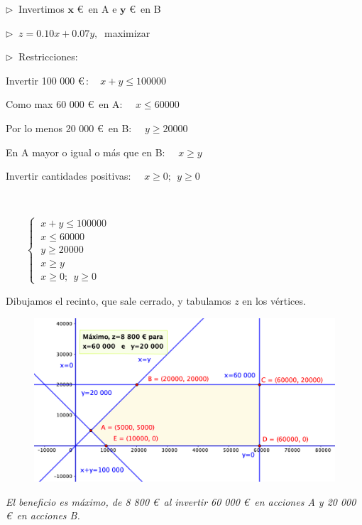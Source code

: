 $\triangleright\ $ Invertimos $\boldsymbol x$ \euro $\,$ en A e $\boldsymbol y$ \euro $\,$ en B

\vspace{3mm} $\triangleright\ $ $ z= 0.10x+0.07 y,\ $ maximizar

\vspace{3mm} $\triangleright\ $ Restricciones:

\begin{multicols}{2}
\begin{small}
Invertir 100 000 \euro $\, : \quad x+y \le 100 000$

Como max 60 000 \euro $\, $ en A: $\quad x\le 60 000$

Por lo menos 20 000 \euro $\,$ en B: $\quad y\ge 20 000$ 

En A mayor o igual o más que en B: $\quad x\ge y$

Invertir cantidades positivas: $\quad x\ge 0;\ \ y\ge 0$
\end{small}
$\,$

$\qquad \begin{cases}
 \ x+y\le 100 000 \\ \ x\le 60 000 \\ \ y\ge 20 000 \\ \ x\ge y 	\\ \ x\ge 0; \ \ y\ge 0	
 \end{cases}$
\end{multicols}
Dibujamos el recinto, que sale cerrado, y tabulamos $z$ en los vértices.

\vspace{3mm}
\begin{figure}[H]
	\centering
	\includegraphics[width=.9\textwidth]{imagenes/img37.png}
\end{figure}

\vspace{3mm} \emph{El beneficio es máximo, de 8 800 \euro $\,$  al invertir 60 000 \euro $\,$  en acciones A y 20 000 \euro $\,$  en acciones B.}



